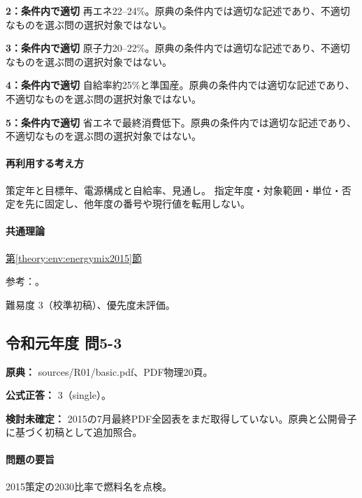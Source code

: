 \noindent\textbf{2：条件内で適切} 再エネ22–24\%。原典の条件内では適切な記述であり、不適切なものを選ぶ問の選択対象ではない。\par

\noindent\textbf{3：条件内で適切} 原子力20–22\%。原典の条件内では適切な記述であり、不適切なものを選ぶ問の選択対象ではない。\par

\noindent\textbf{4：条件内で適切} 自給率約25\%と準国産。原典の条件内では適切な記述であり、不適切なものを選ぶ問の選択対象ではない。\par

\noindent\textbf{5：条件内で適切} 省エネで最終消費低下。原典の条件内では適切な記述であり、不適切なものを選ぶ問の選択対象ではない。\par

\paragraph{再利用する考え方} 策定年と目標年、電源構成と自給率、見通し。 指定年度・対象範囲・単位・否定を先に固定し、他年度の番号や現行値を転用しない。

\paragraph{共通理論} \hyperref[theory:env:energymix2015]{第\ref*{theory:env:energymix2015}節}

\par 参考：\cite{env58_mix2015}。

\par 難易度 3（校準初稿）、優先度未評価。

\subsection{令和元年度 問5-3}
\label{q:r01-reg-basic-5-3}

\noindent\textbf{原典：} sources/R01/basic.pdf、PDF物理20頁。

\textbf{公式正答：} 3（single）。

\par\textbf{検討未確定：} 2015の7月最終PDF全図表をまだ取得していない。原典と公開骨子に基づく初稿として追加照合。

\paragraph{問題の要旨} 2015策定の2030比率で燃料名を点検。

